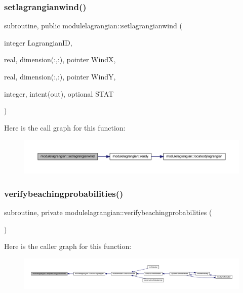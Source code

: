 \subsubsection{\texorpdfstring{setlagrangianwind()}{setlagrangianwind()}}
{\footnotesize\ttfamily subroutine, public modulelagrangian\+::setlagrangianwind (\begin{DoxyParamCaption}\item[{integer}]{Lagrangian\+ID,  }\item[{real, dimension(\+:,\+:), pointer}]{WindX,  }\item[{real, dimension(\+:,\+:), pointer}]{WindY,  }\item[{integer, intent(out), optional}]{S\+T\+AT }\end{DoxyParamCaption})}

Here is the call graph for this function\+:\nopagebreak
\begin{figure}[H]
\begin{center}
\leavevmode
\includegraphics[width=350pt]{namespacemodulelagrangian_ab06dca3c92c46b6fb4d05e0c79c7fbd6_cgraph}
\end{center}
\end{figure}
\mbox{\label{namespacemodulelagrangian_a73aa2ae55efd7276fcb02ec56c40eba3}} 
\subsubsection{\texorpdfstring{verifybeachingprobabilities()}{verifybeachingprobabilities()}}
{\footnotesize\ttfamily subroutine, private modulelagrangian\+::verifybeachingprobabilities (\begin{DoxyParamCaption}{ }\end{DoxyParamCaption})\hspace{0.3cm}{\ttfamily [private]}}

Here is the caller graph for this function\+:\nopagebreak
\begin{figure}[H]
\begin{center}
\leavevmode
\includegraphics[width=350pt]{namespacemodulelagrangian_a73aa2ae55efd7276fcb02ec56c40eba3_icgraph}
\end{center}
\end{figure}
\mbox{\label{namespacemodulelagrangian_a707d19136d3ce2d287f6e476d28385c8}} 
